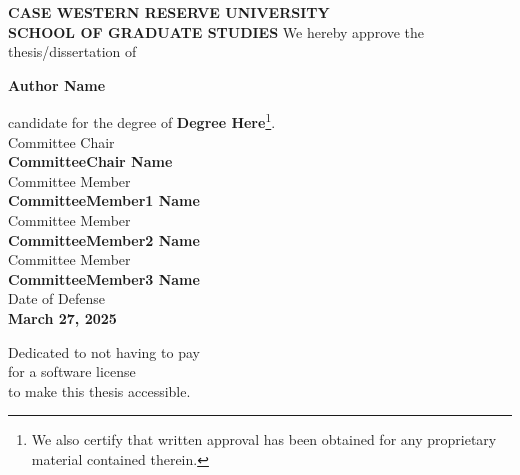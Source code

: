 \documentclass[12pt, oneside]{book}
\begin{document}
\newpage
\begin{center}
    \textbf{\MakeUppercase{Case Western Reserve University}}\\
    \textbf{\MakeUppercase{School of Graduate Studies}}
    \vfill
    We hereby approve the thesis/dissertation of \par
    \textbf{Author Name} \par
    candidate for the degree of \textbf{Degree Here}\footnote{We also certify that written approval has been obtained for any proprietary material contained therein.}.\\
    \vfill
    Committee Chair \\
    \textbf{CommitteeChair Name}\\
    \vfill
    Committee Member \\
    \textbf{CommitteeMember1 Name}\\
    \vfill
    Committee Member \\
    \textbf{CommitteeMember2 Name}\\
    \vfill
    Committee Member \\
    \textbf{CommitteeMember3 Name}\\
    \vfill
    Date of Defense \\
    \textbf{March 27, 2025}
\end{center}




\clearpage
\begin{center}
    \thispagestyle{empty}
    \vspace*{\fill}
    Dedicated to not having to pay\\
    for a software license\\
    to make this thesis accessible.
    \vspace*{\fill}
\end{center}
\clearpage


%
\end{document}
